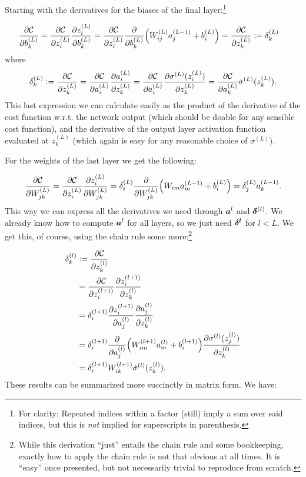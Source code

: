\documentclass[Thesis.tex]{subfiles}
\begin{document}
Starting with the derivatives for the biases of the final layer:\footnote{For
  clarity: Repeated indices within a factor (still) imply a sum over said
  indices, but this is \emph{not} implied for superscripts in parenthesis.}

\begin{align}
  \pdv{\mathcal{C}}{b_k^{(L)}} &=
\pdv{\mathcal{C}}{z_i^{(L)}}\pdv{z_i^{(L)}}{b_k^{(L)}}
=\pdv{\mathcal{C}}{z_i^{(L)}}\pdv{}{b_k^{(L)}}\qty(W_{ij}^{(L)}a_j^{(L-1)} +
b_i^{(L)}) = \pdv{\mathcal{C}}{z_k^{(L)}}\vcentcolon= \delta_k^{(L)}
\end{align}
where
\begin{align}
  \delta_k^{(L)}\vcentcolon= \pdv{\mathcal{C}}{z_k^{(L)}} =
\pdv{\mathcal{C}}{a^{(L)}_{i}}\pdv{a_i^{(L)}}{z_k^{(L)}} =
\pdv{\mathcal{C}}{a^{(L)}_{i}}\pdv{\sigma^{(L)}(z_i^{(L)})}{z_k^{(L)}} =
\pdv{\mathcal{C}}{a^{(L)}_{k}}\dot\sigma^{(L)}(z_k^{(L)}).
\end{align}
This last expression we can calculate easily as the product of the derivative of
the cost function w.r.t. the network output (which should be doable for any
sensible cost function), and the derivative of the output layer activation
function evaluated at $z_k^{(L)}$ (which again is easy for any reasonable choice
of $\sigma^{(L)}$).

For the weights of the last layer we get the following:

\begin{align}
  \pdv{\mathcal{C}}{W_{jk}^{(L)}} =
\pdv{\mathcal{C}}{z_i^{(L)}}\pdv{z_i^{(L)}}{W_{jk}^{(L)}} =
\delta_i^{(L)}\pdv{}{W_{jk}^{(L)}}\qty(W_{im}a_m^{(L-1)} + b_i^{(L)}) = \delta_j^{(L)}a_k^{(L-1)}.
\end{align}
This way we can express all the derivatives we need through $\bm{a}^{l}$ and
$\bm{\delta}^{(l)}$. We already know how to compute $\bm{a}^{l}$ for all layers,
so we just need $\bm{\delta^{l}}$ for $l < L$. We get this, of course, using the
chain rule some more:\footnote{While this derivation ``just'' entails the chain
  rule and some bookkeeping, exactly how to apply the chain rule is not that
  obvious at all times. It is ``easy'' once presented, but not necessarily
  trivial to reproduce from scratch.}

\begin{align}
  \delta_k^{(l)} &\vcentcolon= \pdv{\mathcal{C}}{z_k^{(l)}}\\
                 &= \pdv{\mathcal{C}}{z_i^{(l+1)}}\pdv{z_i^{(l+1)}}{z_k^{(l)}}\\
                 &= \delta_i^{(l+1)} \pdv{z_i^{(l+1)}}{a_j^{(l)}}\pdv{a_j^{(l)}}{z_k^{(l)}} \\
                 &= \delta_i^{(l+1)}\pdv{}{a_j^{(l)}}\qty(W_{im}^{(l+1)}a_m^{(l)} + b_i^{(l+1)})\pdv{\sigma^{(l)}(z_j^{(l)})}{z_k^{(l)}}\\
                 &= \delta_i^{(l+1)}W_{ik}^{(l+1)}\dot\sigma^{(l)}(z_k^{(l)}).
\end{align}
These results can be summarized more succinctly in matrix form. We have:
\end{document}
